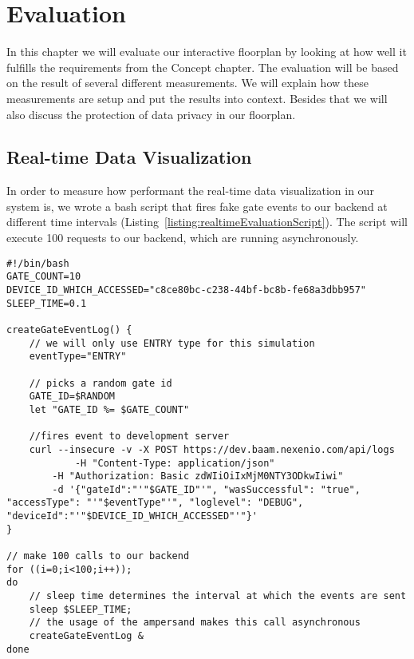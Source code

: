 \section{Evaluation}

In this chapter we will evaluate our interactive floorplan by looking at how well it fulfills the requirements from the Concept chapter. The evaluation will be based on the result of several different measurements. We will explain how these measurements are setup and put the results into context. Besides that we will also discuss the protection of data privacy in our floorplan.

\subsection{Real-time Data Visualization}

In order to measure how performant the real-time data visualization in our system is, we wrote a bash script that fires fake gate events to our backend at different time intervals (Listing~\ref{listing:realtimeEvaluationScript}). The script will execute 100 requests to our backend, which are running asynchronously.

\begin{lstlisting}[label={listing:realtimeEvaluationScript},caption={Bash Script for creating fake gate events at intervals}]
#!/bin/bash
GATE_COUNT=10
DEVICE_ID_WHICH_ACCESSED="c8ce80bc-c238-44bf-bc8b-fe68a3dbb957"
SLEEP_TIME=0.1

createGateEventLog() {
    // we will only use ENTRY type for this simulation
    eventType="ENTRY"

	// picks a random gate id 
    GATE_ID=$RANDOM
    let "GATE_ID %= $GATE_COUNT"

	//fires event to development server
    curl --insecure -v -X POST https://dev.baam.nexenio.com/api/logs 
    		-H "Content-Type: application/json" 
		-H "Authorization: Basic zdWIiOiIxMjM0NTY3ODkwIiwi" 
		-d '{"gateId":"'"$GATE_ID"'", "wasSuccessful": "true", "accessType": "'"$eventType"'", "loglevel": "DEBUG", "deviceId":"'"$DEVICE_ID_WHICH_ACCESSED"'"}'
}

// make 100 calls to our backend
for ((i=0;i<100;i++));
do
	// sleep time determines the interval at which the events are sent
    sleep $SLEEP_TIME;
    // the usage of the ampersand makes this call asynchronous
    createGateEventLog &
done

\end{lstlisting}


